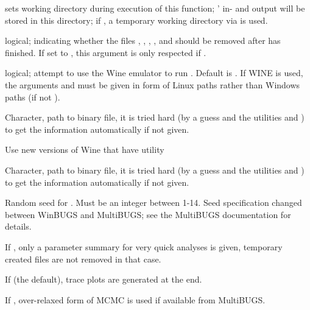 \begin{Arguments}
\begin{ldescription}
\item[\code{working.directory}] sets working directory during execution of
this function; ' in- and output will be stored in this
directory; if , a temporary working directory via
 is used.
\item[\code{clearWD}] logical; indicating whether the files ,
, , ,
and  should be removed after  has
finished.  If set to , this argument is only respected if
.
\item[\code{useWINE}] logical; attempt to use the Wine emulator to run
. Default is . If WINE is used, the arguments  and  must be given in form of Linux paths
rather than Windows paths (if not ).
\item[\code{WINE}] Character, path to  binary file, it is
tried hard (by a guess and the utilities  and )
to get the information automatically if not given.
\item[\code{newWINE}] Use new versions of Wine that have 
utility
\item[\code{WINEPATH}] Character, path to  binary file, it is
tried hard (by a guess and the utilities  and )
to get the information automatically if not given.
\item[\code{bugs.seed}] Random seed for .  Must be an integer between 1-14.  Seed
specification changed between WinBUGS and MultiBUGS;  see the MultiBUGS documentation for
details.
\item[\code{summary.only}] If , only a parameter summary for very quick analyses is given,
temporary created files are not removed in that case.
\item[\code{save.history}] If  (the default), trace plots are generated at the end.
\item[\code{over.relax}] If , over-relaxed form of MCMC is used if available from MultiBUGS.
\end{ldescription}
\end{Arguments}
%
